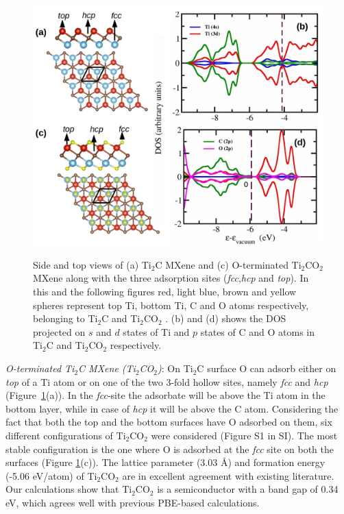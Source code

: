 \begin{figure}[ht]
 \begin{center}
    \includegraphics[width=12cm]{Appendix2/Appendix2_figures/mxene.jpg} \\[0cm]
 \end{center}
 \caption{Side and top views of (a) Ti$_2$C MXene and (c) O-terminated Ti$_2$CO$_2$ MXene along with the three adsorption sites ({\it fcc},{\it hcp} and {\it top}). In this and the following figures red, light blue, brown and yellow spheres represent top Ti, bottom Ti, C and O atoms
 respectively, belonging to 
 Ti$_2$C and Ti$_2$CO$_2$ . (b) and (d) shows the DOS projected on $s$ and $d$ states of Ti
 and $p$ states of C and O atoms in Ti$_2$C and Ti$_2$CO$_2$ respectively.}
  \label{fig:1}
\end{figure}


 \noindent \textit{O-terminated Ti$_2$C MXene (Ti$_2$CO$_2$)}: On Ti$_2$C surface O can 
 adsorb either on {\it top} of a Ti atom or on one of the two 3-fold hollow sites,  namely {\it fcc} and {\it hcp} (Figure~\ref{fig:1}(a)). In the {\it fcc}-site the  adsorbate will be above the Ti atom in the bottom layer, while in case of {\it hcp} it 
 will be above the C atom. Considering the fact that both the top and the bottom  surfaces have O adsorbed on them, six different configurations of Ti$_2$CO$_2$ were  considered (Figure S1 in SI). The most stable configuration is the one where 
 O is adsorbed at the {\it fcc} site on both the surfaces (Figure \ref{fig:1}(c)). The 
 lattice parameter (3.03 {\AA}) and formation energy (-5.06 eV/atom) of Ti$_2$CO$_2$ are
 in excellent agreement with existing literature\cite{khazaei2013novel}. Our 
 calculations show that Ti$_2$CO$_2$ is a semiconductor with a band gap of 0.34 eV, 
 which agrees well with previous PBE-based calculations.\cite{khazaei2013novel} 


